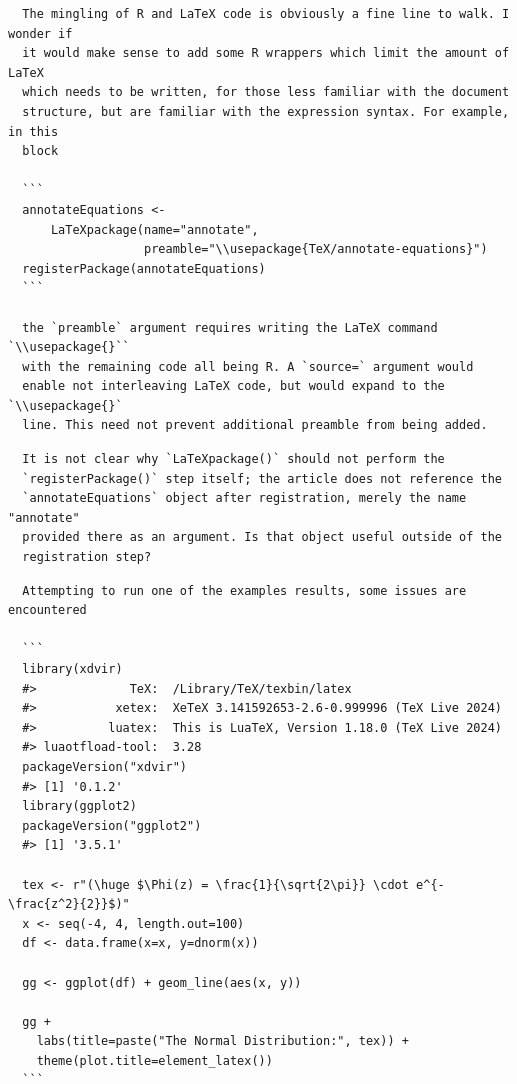 \documentclass{article}
\begin{document}
\begin{verbatim}
  The mingling of R and LaTeX code is obviously a fine line to walk. I wonder if
  it would make sense to add some R wrappers which limit the amount of LaTeX 
  which needs to be written, for those less familiar with the document 
  structure, but are familiar with the expression syntax. For example, in this 
  block

  ```
  annotateEquations <-
      LaTeXpackage(name="annotate",
                   preamble="\\usepackage{TeX/annotate-equations}")
  registerPackage(annotateEquations)
  ```

  the `preamble` argument requires writing the LaTeX command `\\usepackage{}``
  with the remaining code all being R. A `source=` argument would
  enable not interleaving LaTeX code, but would expand to the `\\usepackage{}`
  line. This need not prevent additional preamble from being added.
\end{verbatim}

\begin{verbatim}
  It is not clear why `LaTeXpackage()` should not perform the 
  `registerPackage()` step itself; the article does not reference the 
  `annotateEquations` object after registration, merely the name "annotate" 
  provided there as an argument. Is that object useful outside of the 
  registration step?
\end{verbatim}

\begin{verbatim}
  Attempting to run one of the examples results, some issues are encountered

  ```
  library(xdvir)
  #>             TeX:  /Library/TeX/texbin/latex
  #>           xetex:  XeTeX 3.141592653-2.6-0.999996 (TeX Live 2024)
  #>          luatex:  This is LuaTeX, Version 1.18.0 (TeX Live 2024)
  #> luaotfload-tool:  3.28
  packageVersion("xdvir")
  #> [1] '0.1.2'
  library(ggplot2)
  packageVersion("ggplot2")
  #> [1] '3.5.1'

  tex <- r"(\huge $\Phi(z) = \frac{1}{\sqrt{2\pi}} \cdot e^{-\frac{z^2}{2}}$)"
  x <- seq(-4, 4, length.out=100)
  df <- data.frame(x=x, y=dnorm(x))

  gg <- ggplot(df) + geom_line(aes(x, y))

  gg +
    labs(title=paste("The Normal Distribution:", tex)) +
    theme(plot.title=element_latex())
  ```

\end{verbatim}
\end{document}
